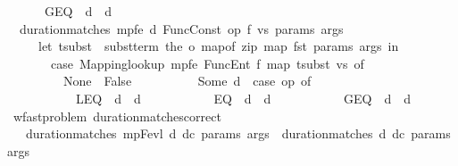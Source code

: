 \begin{isabellebody}
\ \ \ \ \ \ {\isacharbar}{\kern0pt}\ GEQ\ {\isasymRightarrow}\ d\ {\isasymge}\ d{\isacharprime}{\kern0pt}{\isacharparenright}{\kern0pt}{\isachardoublequoteclose}\isanewline
\ \ {\isacharbar}{\kern0pt}\ {\isachardoublequoteopen}duration{\isacharunderscore}{\kern0pt}matches{\isacharprime}{\kern0pt}\ mp{\isacharunderscore}{\kern0pt}fe\ d\ {\isacharparenleft}{\kern0pt}Func{\isacharunderscore}{\kern0pt}Const\ op\ f\ vs{\isacharparenright}{\kern0pt}\ params\ args\ {\isasymlongleftrightarrow}\ \isanewline
\ \ \ \ \ \ {\isacharparenleft}{\kern0pt}let\ tsubst\ {\isacharequal}{\kern0pt}\ subst{\isacharunderscore}{\kern0pt}term\ {\isacharparenleft}{\kern0pt}the\ o\ {\isacharparenleft}{\kern0pt}map{\isacharunderscore}{\kern0pt}of\ {\isacharparenleft}{\kern0pt}zip\ {\isacharparenleft}{\kern0pt}map\ fst\ params{\isacharparenright}{\kern0pt}\ args{\isacharparenright}{\kern0pt}{\isacharparenright}{\kern0pt}{\isacharparenright}{\kern0pt}\ in\isanewline
\ \ \ \ \ \ \ \ case\ Mapping{\isachardot}{\kern0pt}lookup\ mp{\isacharunderscore}{\kern0pt}fe\ {\isacharparenleft}{\kern0pt}FuncEnt\ f\ {\isacharparenleft}{\kern0pt}map\ tsubst\ vs{\isacharparenright}{\kern0pt}{\isacharparenright}{\kern0pt}\ of\ \isanewline
\ \ \ \ \ \ \ \ \ \ None\ {\isasymRightarrow}\ False\ \isanewline
\ \ \ \ \ \ \ \ {\isacharbar}{\kern0pt}\ Some\ d{\isacharprime}{\kern0pt}\ {\isasymRightarrow}\ {\isacharparenleft}{\kern0pt}case\ op\ of\isanewline
\ \ \ \ \ \ \ \ \ \ \ \ LEQ\ {\isasymRightarrow}\ d\ {\isasymle}\ d{\isacharprime}{\kern0pt}\isanewline
\ \ \ \ \ \ \ \ \ \ {\isacharbar}{\kern0pt}\ EQ\ {\isasymRightarrow}\ d\ {\isacharequal}{\kern0pt}\ d{\isacharprime}{\kern0pt}\isanewline
\ \ \ \ \ \ \ \ \ \ {\isacharbar}{\kern0pt}\ GEQ\ {\isasymRightarrow}\ d\ {\isasymge}\ d{\isacharprime}{\kern0pt}{\isacharparenright}{\kern0pt}{\isacharparenright}{\kern0pt}{\isachardoublequoteclose}\isanewline
\isanewline
\ \ \isamarkupfalse%
\ {\isacharparenleft}{\kern0pt}\ wf{\isacharunderscore}{\kern0pt}ast{\isacharunderscore}{\kern0pt}problem{\isacharparenright}{\kern0pt}\ duration{\isacharunderscore}{\kern0pt}matches{\isacharprime}{\kern0pt}{\isacharunderscore}{\kern0pt}correct{\isacharcolon}{\kern0pt}\ \ \ \ \isanewline
\ \ \ \ {\isachardoublequoteopen}duration{\isacharunderscore}{\kern0pt}matches{\isacharprime}{\kern0pt}\ mp{\isacharunderscore}{\kern0pt}Fevl\ d\ dc\ params\ args\ {\isasymlongleftrightarrow}\ duration{\isacharunderscore}{\kern0pt}matches\ d\ dc\ params\ args{\isachardoublequoteclose}\isanewline
%
\isadelimproof
\ \ \ \ %
\endisadelimproof
%
\isatagproof
{}\isamarkupfalse%

\end{isabellebody}
